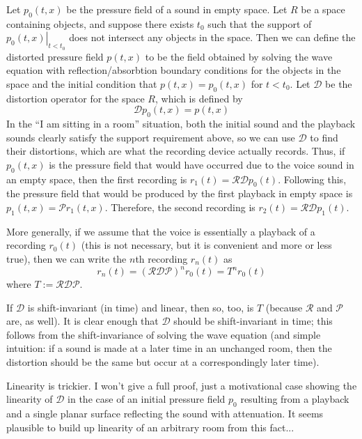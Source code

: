 \documentclass{homework}
\begin{document}
 	 Let \(p_0(t,x)\) be the pressure field of a sound in empty space. Let \(R\) be a space containing objects, and suppose there exists \(t_0\) such that the support of \(\left.p_0(t,x)\right|_{t<t_0}\) does not intersect any objects in the space. Then we can define the distorted pressure field \(p(t,x)\) to be the field obtained by solving the wave equation with reflection/absorbtion boundary conditions for the objects in the space and the initial condition that \(p(t,x)=p_0(t,x)\) for \(t < t_0\). Let \(\mathcal{D}\) be the distortion operator for the space \(R\), which is defined by
 	 \begin{equation*}
 	 	\mathcal{D}p_0(t,x) = p(t,x)
 	 \end{equation*}
  	 In the ``I am sitting in a room'' situation, both the initial sound and the playback sounds clearly satisfy the support requirement above, so we can use \(\mathcal{D}\) to find their distortions, which are what the recording device actually records. Thus, if \(p_0(t,x)\) is the pressure field that would have occurred due to the voice sound in an empty space, then the first recording is \(r_1(t) = \mathcal{R}\mathcal{D}p_0(t)\). Following this, the pressure field that would be produced by the first playback in empty space is \(p_1(t,x)=\mathcal{P}r_1(t,x)\). Therefore, the second recording is \(r_2(t) = \mathcal{R}\mathcal{D}p_1(t)\).
  	 
  	 More generally, if we assume that the voice is essentially a playback of a recording \(r_0(t)\) (this is not necessary, but it is convenient and more or less true), then we can write the \(n\)th recording \(r_n(t)\) as
  	 \begin{equation}\label{eq:r_n}
  	 	r_n(t) = (\mathcal{R}\mathcal{D}\mathcal{P})^n r_0(t) = T^n r_0(t)
  	 \end{equation}
   	 where \(T:=\mathcal{R}\mathcal{D}\mathcal{P}\).
   	 
   	 If \(\mathcal{D}\) is shift-invariant (in time) and linear, then so, too, is \(T\) (because \(\mathcal{R}\) and \(\mathcal{P}\) are, as well). It is clear enough that \(\mathcal{D}\) should be shift-invariant in time; this follows from the shift-invariance of solving the wave equation (and simple intuition: if a sound is made at a later time in an unchanged room, then the distortion should be the same but occur at a correspondingly later time). 
   	 
   	 Linearity is trickier. I won't give a full proof, just a motivational case showing the linearity of \(\mathcal{D}\) in the case of an initial pressure field \(p_0\) resulting from a playback and a single planar surface reflecting the sound with attenuation. It seems plausible to build up linearity of an arbitrary room from this fact...
   	 
\end{document}
